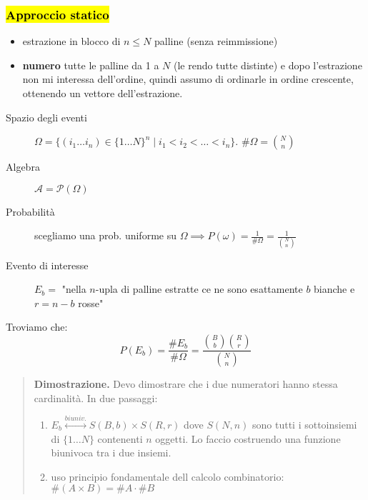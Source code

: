 \documentclass[a4paper,10pt]{article}
\theoremstyle{remark}
\theoremstyle{definition}
\newenvironment{dimo}{\begin{quote}\textbf{Dimostrazione.}}{\end{quote}} %
\begin{document}
\subsubsection*{\hl{Approccio statico}}
\begin{itemize}
    \item estrazione in blocco di $n\le N$ palline (senza reimmissione)
    \item \textbf{numero} tutte le palline da 1 a $N$ (le rendo tutte distinte) e dopo l'estrazione non mi interessa dell'ordine, quindi assumo di ordinarle in ordine crescente, ottenendo un vettore dell'estrazione.
\end{itemize}
\begin{description}
    \item[Spazio degli eventi] $\Omega=\{(i_1 \dots i_n) \in \{1 \dots N\}^n \mid i_1<i_2<\dots<i_n\}$. $\#\Omega=\binom{N}{n}$
    \item[Algebra] $\mathcal{A}=\mathscr{P}(\Omega)$
    \item[Probabilità] scegliamo una prob. uniforme su $\Omega \implies P(\omega)=\frac{1}{\#\Omega}=\frac{1}{\binom{N}{n}}$ 
    \item[Evento di interesse] $E_b =$ "nella $n$-upla di palline estratte ce ne sono esattamente $b$ bianche e $r=n-b$ rosse"
\end{description}
Troviamo che:
$$P(E_b)=\frac{\#E_b}{\#\Omega}= \frac{\binom{B}{b}\binom{R}{r}}{\binom{N}{n}}$$
\begin{dimo}
    Devo dimostrare che i due numeratori hanno stessa cardinalità. In due passaggi:
    \begin{enumerate}
        \item $E_b \overset{biuniv.}{\longleftrightarrow} S(B,b)\times S(R,r)$ dove $S(N,n)$ sono tutti i sottoinsiemi di $\{1\dots N\}$ contenenti $n$ oggetti. Lo faccio costruendo una funzione biunivoca tra i due insiemi.
        \item uso principio fondamentale dell calcolo combinatorio: $\#(A\times B)=\#A\cdot\#B$
    \end{enumerate}
\end{dimo}
\end{document}
